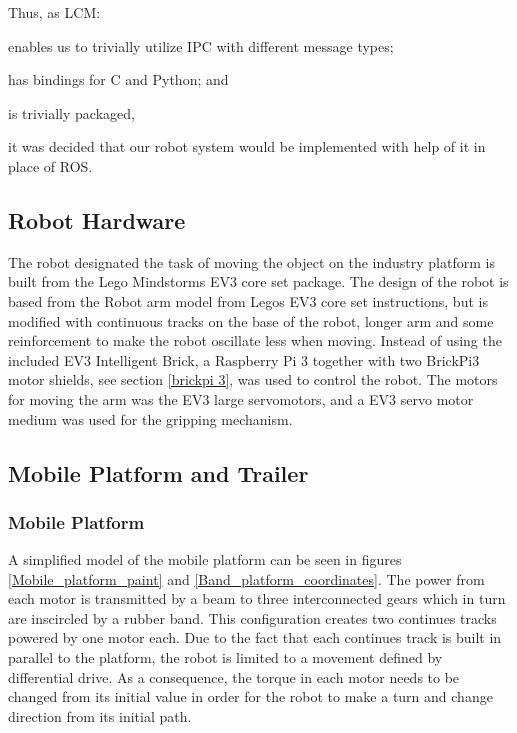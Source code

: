 Thus, as LCM:
\begin{inline-enum}
\item enables us to trivially utilize IPC with different message types;
\item has bindings for C and Python; and
\item is trivially packaged,
\end{inline-enum}
it was decided that our robot system would be implemented with help of it in place of ROS.

\subsection{Robot Hardware}
The robot designated the task of moving the object on the industry platform is built from the Lego Mindstorms EV3 core set package. The design of the robot is based from the Robot arm model from Legos EV3 core set instructions, but is modified with continuous tracks on the base of the robot, longer arm and some reinforcement to make the robot oscillate less when moving. Instead of using the included EV3 Intelligent Brick, a Raspberry Pi 3 together with two BrickPi3 motor shields, see section \ref{brickpi 3}, was used to control the robot. The motors for moving the arm was the EV3 large servomotors, and a EV3 servo motor medium was used for the gripping mechanism.


\newpage
\subsection {Mobile Platform and Trailer}
\subsubsection{Mobile Platform}
A simplified model of the mobile platform can be seen in figures \ref{Mobile_platform_paint} and \ref{Band_platform_coordinates}. The power from each motor is transmitted by a beam to three interconnected gears which in turn are inscircled by a rubber band. This configuration  creates two continues tracks powered by one motor each. Due to the fact that each continues track is built in parallel to the platform, the robot is limited to a movement defined by differential drive. As a consequence, the torque in each motor needs to be changed from its initial value in order for the robot to make a turn and change direction from its initial path. 



